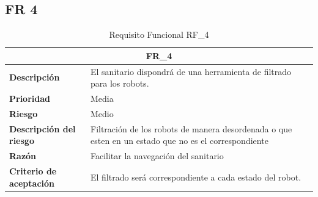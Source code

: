 \documentclass{scrreprt}
\begin{document}
\subsection{FR 4}
    \begin{table}[H]
        \label{tab:my-table}
        \begin{tabular}{|p{5cm}|p{11cm}|}
        \hline
        \multicolumn{2}{|c|}{\textbf{FR_4}} \\
        \hline
        \textbf{Descripción  }                      &  El sanitario dispondrá de una herramienta de filtrado para los robots.                                                                       \\ \hline
        \textbf{Prioridad}                          & Media                                                                                              \\ \hline
        \textbf{Riesgo}                          & Medio                                                                                                \\ \hline
        \textbf{Descripción del riesgo}                    & Filtración de los robots de manera desordenada o que esten en un estado que no es el correspondiente                        \\ \hline
        \textbf{Razón}                   & Facilitar la navegación del sanitario                                                                                                                \\ \hline
        \textbf{Criterio de aceptación}                    & El filtrado será correspondiente a cada estado del robot.  \\ \hline
        \end{tabular}%
        
        \caption{Requisito Funcional RF_4}
\end{table}
\end{document}
